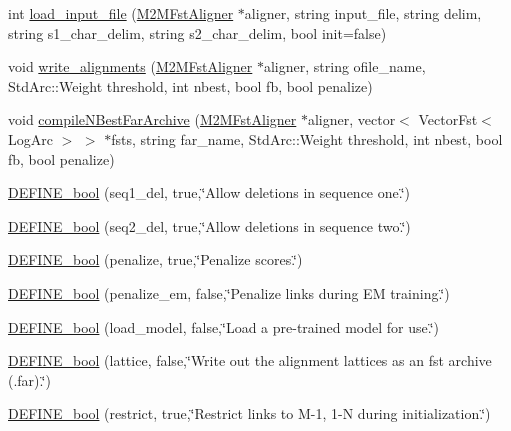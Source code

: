 \begin{DoxyCompactItemize}
\item 
int \hyperlink{phonetisaurus-align_8cc_a5b968534ba908e3665cbdb1a7d32cab3}{load\+\_\+input\+\_\+file} (\hyperlink{classfst_1_1_m2_m_fst_aligner}{M2\+M\+Fst\+Aligner} $\ast$aligner, string input\+\_\+file, string delim, string s1\+\_\+char\+\_\+delim, string s2\+\_\+char\+\_\+delim, bool init=false)
\item 
void \hyperlink{phonetisaurus-align_8cc_a3c7baa67124566fca72dccbbe07898b0}{write\+\_\+alignments} (\hyperlink{classfst_1_1_m2_m_fst_aligner}{M2\+M\+Fst\+Aligner} $\ast$aligner, string ofile\+\_\+name, Std\+Arc\+::\+Weight threshold, int nbest, bool fb, bool penalize)
\item 
void \hyperlink{phonetisaurus-align_8cc_aee3872a1716dba7313069f74cf4a3f26}{compile\+N\+Best\+Far\+Archive} (\hyperlink{classfst_1_1_m2_m_fst_aligner}{M2\+M\+Fst\+Aligner} $\ast$aligner, vector$<$ Vector\+Fst$<$ Log\+Arc $>$ $>$ $\ast$fsts, string far\+\_\+name, Std\+Arc\+::\+Weight threshold, int nbest, bool fb, bool penalize)
\item 
\hyperlink{phonetisaurus-align_8cc_a519390dc2a08a10bbeac1d66a8acf40b}{D\+E\+F\+I\+N\+E\+\_\+bool} (seq1\+\_\+del, true,\char`\"{}Allow deletions in sequence one.\char`\"{})
\item 
\hyperlink{phonetisaurus-align_8cc_a026901d5c2decd26c9076998f7bd6343}{D\+E\+F\+I\+N\+E\+\_\+bool} (seq2\+\_\+del, true,\char`\"{}Allow deletions in sequence two.\char`\"{})
\item 
\hyperlink{phonetisaurus-align_8cc_aa289cf922ae8f8b5d684f13d477a3a19}{D\+E\+F\+I\+N\+E\+\_\+bool} (penalize, true,\char`\"{}Penalize scores.\char`\"{})
\item 
\hyperlink{phonetisaurus-align_8cc_a04d2e69f65d7950b9c648b42d62d0647}{D\+E\+F\+I\+N\+E\+\_\+bool} (penalize\+\_\+em, false,\char`\"{}Penalize links during EM training.\char`\"{})
\item 
\hyperlink{phonetisaurus-align_8cc_a5bc870033331f892f7bd65a94264154d}{D\+E\+F\+I\+N\+E\+\_\+bool} (load\+\_\+model, false,\char`\"{}Load a pre-\/trained model for use.\char`\"{})
\item 
\hyperlink{phonetisaurus-align_8cc_a01c283c5fcd61f1edd3e116e103b7653}{D\+E\+F\+I\+N\+E\+\_\+bool} (lattice, false,\char`\"{}Write out the alignment lattices as an fst archive (.far).\char`\"{})
\item 
\hyperlink{phonetisaurus-align_8cc_aa3017ec90c1954b9995598f44db31c69}{D\+E\+F\+I\+N\+E\+\_\+bool} (restrict, true,\char`\"{}Restrict links to M-\/1, 1-\/N during initialization.\char`\"{})

\end{DoxyCompactItemize}
